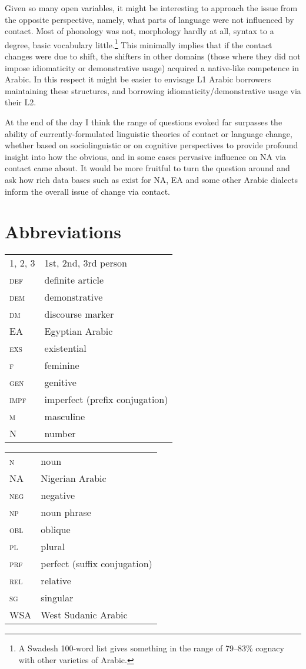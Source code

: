 \documentclass[output=paper]{langsci/langscibook}
\begin{document}
Given so many open variables, it might be interesting to approach the issue from the opposite perspective, namely, what parts of language were not influenced by contact. Most of phonology was not, morphology hardly at all, syntax to a degree, basic vocabulary little.\footnote{A Swadesh 100-word list gives something in the range of 79–83\% cognacy with   other varieties of Arabic.} This minimally implies that if the contact changes were due to shift, the shifters in other domains (those where they did not impose idiomaticity or demonstrative usage) acquired a native-like competence in Arabic. In this respect it might be easier to envisage L1 Arabic borrowers maintaining these structures, and borrowing idiomaticity/demonstrative usage via their L2. 

At the end of the day I think the range of questions evoked far surpasses the ability of currently-formulated linguistic theories of contact or language change, whether based on sociolinguistic or on cognitive perspectives \citep[523]{Lucas2015} to provide profound insight into how the obvious, and in some cases pervasive influence on NA via contact came about. It would be more fruitful to turn the question around and ask how rich data bases such as exist for NA, EA and some other Arabic dialects inform the overall issue of change via contact. 

 
\section*{Abbreviations}

\begin{tabularx}{.5\textwidth}{@{}lQ@{}}
\textsc{1, 2, 3} & 1st, 2nd, 3rd person \\
\textsc{def} & definite article \\
\textsc{dem} & demonstrative \\
\textsc{dm} & discourse marker \\
EA & Egyptian Arabic \\
\textsc{exs} & existential  \\
\textsc{f} & feminine \\
\textsc{gen} & genitive \\
\textsc{impf} & imperfect (prefix conjugation) \\
\textsc{m} & masculine \\
N & number \\
\end{tabularx}%
\begin{tabularx}{.5\textwidth}{@{}lQ@{}}
\textsc{n} & noun \\
NA & {Nigerian Arabic} \\
\textsc{neg} & negative \\
\textsc{np} & noun phrase \\
\textsc{obl} & oblique \\
\textsc{pl} & plural \\
\textsc{prf} & perfect (suffix conjugation) \\
\textsc{rel} & relative \\
\textsc{sg} & singular \\
WSA & West Sudanic Arabic \\
\end{tabularx}%


\sloppy
\printbibliography[heading=subbibliography,notkeyword=this] 
\end{document}
